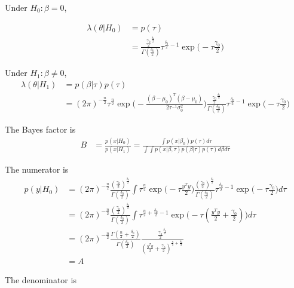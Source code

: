 \begin{itemize}
 Under $H_0: \beta = 0$, 
 
 \begin{align*}
 \lambda(\theta | H_0) &= p(\tau) \\
 &= \frac{\frac{\gamma_0}{2}^{\frac{\delta_0}{2}}}{\Gamma(\frac{\delta_0}{2})} \tau^{\frac{\delta_0}{2}-1} \exp \Big(-\tau \frac{\gamma_0}{2} \Big)
\end{align*}

Under $H_1: \beta \neq 0$, 
  \begin{align*}
 \lambda(\theta | H_1) &= p( \beta | \tau) p(\tau) \\
 &= (2\pi)^{-\frac{n}{2}} \tau^{\frac{n}{2}} \exp \Big( - \frac{(\beta - \mu_0)^T (\beta - \mu_0)}{2 \tau^{-1} \sigma^2_0} \Big) \frac{\frac{\gamma_0}{2}^{\frac{\delta_0}{2}}}{\Gamma(\frac{\delta_0}{2})} \tau^{\frac{\delta_0}{2}-1} \exp \Big(-\tau \frac{\gamma_0}{2} \Big)
\end{align*}


 The Bayes factor is
 \begin{align*}
 B &=  \frac{p(x | {H_0})}{p(x| {H_1})} = \frac{\int p(x | \beta_0) p(\tau) d \tau}{\int \int p(x | \beta, \tau) p(\beta| \tau) p(\tau) d\beta d\tau}
\end{align*}
 
 The numerator is
  \begin{align*}
 p(y | {H_0}) &= (2\pi)^{-\frac{n}{2}} \frac{(\frac{\gamma_0}{2})^{\frac{\delta_0}{2}}}{\Gamma(\frac{\delta_0}{2})} \int \tau^{\frac{n}{2}} \exp \Big(- \tau \frac{y^T y}{2} \Big) \frac{(\frac{\gamma_0}{2})^{\frac{\delta_0}{2}}} {\Gamma(\frac{\delta_0}{2})} \tau^{\frac{\delta_0}{2}-1} \exp \Big(-\tau \frac{\gamma_0}{2} \Big) d\tau \\
 &=  (2\pi)^{-\frac{n}{2}} \frac{(\frac{\gamma_0}{2})^{\frac{\delta_0}{2}}}{\Gamma(\frac{\delta_0}{2})} \int \tau^{\frac{n}{2} + \frac{\delta_0}{2} -1} \exp \Big( - \tau (\frac{y^T y}{2} + \frac{\gamma_0}{2}) \Big) d\tau \\
 &= (2\pi)^{-\frac{n}{2}}  \frac{\Gamma(\frac{n}{2} + \frac{\delta_0}{2})}{\Gamma(\frac{\delta_0}{2})} \frac{\frac{\gamma_0}{2}^{\frac{\delta_0}{2}}}{(\frac{y^T y}{2} + \frac{\gamma_0}{2})^{\frac{n}{2} + \frac{\delta_0}{2}}}\\
 &= A
\end{align*}

The denominator is 


\end{itemize}

